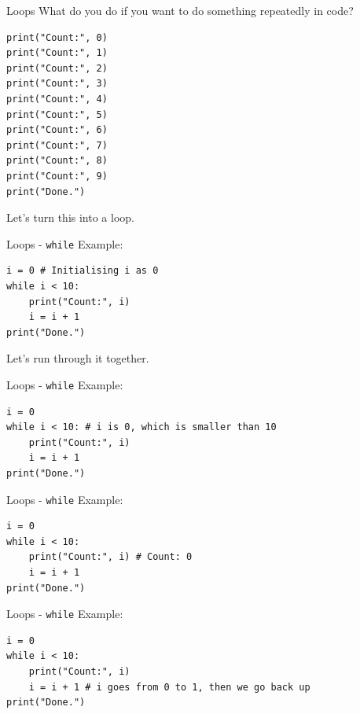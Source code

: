 \documentclass[dvipsnames, svgnames, x11names, handout]{beamer}
\begin{document}
\begin{frame}[fragile]{Loops}
What do you do if you want to do something repeatedly in code? \pause 
\begin{verbatim}
print("Count:", 0)
print("Count:", 1)
print("Count:", 2)
print("Count:", 3)
print("Count:", 4)
print("Count:", 5)
print("Count:", 6)
print("Count:", 7)
print("Count:", 8)
print("Count:", 9)
print("Done.")
\end{verbatim} 
\pause 
Let's turn this into a loop.
\end{frame}

\begin{frame}[fragile]{Loops - \texttt{while}}
Example:
\begin{verbatim}
i = 0 # Initialising i as 0
while i < 10:
    print("Count:", i)
    i = i + 1
print("Done.")
\end{verbatim}
Let's run through it together.
\end{frame}

\addtocounter{framenumber}{-1}

\begin{frame}[fragile]{Loops - \texttt{while}}
Example:
\begin{verbatim}
i = 0
while i < 10: # i is 0, which is smaller than 10
    print("Count:", i)
    i = i + 1
print("Done.")
\end{verbatim}
\end{frame}

\addtocounter{framenumber}{-1}

\begin{frame}[fragile]{Loops - \texttt{while}}
Example:
\begin{verbatim}
i = 0
while i < 10: 
    print("Count:", i) # Count: 0
    i = i + 1
print("Done.")
\end{verbatim}
\end{frame}

\addtocounter{framenumber}{-1}

\begin{frame}[fragile]{Loops - \texttt{while}}
Example:
\begin{verbatim}
i = 0
while i < 10: 
    print("Count:", i)
    i = i + 1 # i goes from 0 to 1, then we go back up
print("Done.")
\end{verbatim}
\end{frame}

\addtocounter{framenumber}{-1}
\end{document}
